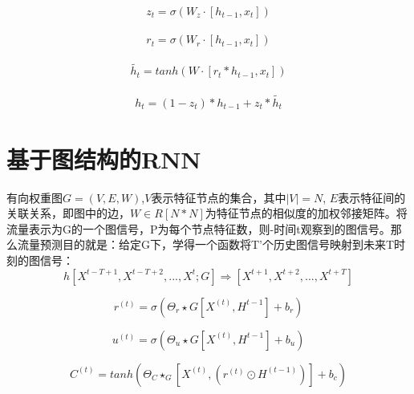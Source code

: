   \begin{equation}
    \begin{aligned}
        z_t = \sigma(W_z\cdot [h_{t-1},x_t])
    \end{aligned}
\end{equation}

\begin{equation}
    \begin{aligned}
        r_t = \sigma(W_r\cdot[h_{t-1},x_t])
    \end{aligned}
\end{equation}

\begin{equation}
    \begin{aligned}
        \widetilde {h_t} = tanh(W\cdot[r_t * h_{t-1}, x_t])
    \end{aligned}
\end{equation}

\begin{equation}
    \begin{aligned}
        h_t = (1- z_t) * h_{t-1} + z_t * \widetilde{h_t}
    \end{aligned}
\end{equation}

\section{基于图结构的RNN}
有向权重图$G=(V,E,W)$,$V$表示特征节点的集合，其中$|V|=N$, $E$表示特征间的关联关系，即图中的边，$W∈R[N*N]$为特征节点的相似度的加权邻接矩阵。将流量表示为G的一个图信号，P为每个节点特征数，则-时间t观察到的图信号。那么流量预测目的就是：给定G下，学得一个函数将T'个历史图信号映射到未来T时刻的图信号：
\begin{equation}
    h[X^{t-T+1}, X^{t-T+2},...,X^{t}; G] \Rightarrow [X^{t+1}, X^{t+2}, ..., X^{t+T}]
\end{equation}

\begin{equation}
    r^{(t)} = \sigma(\Theta_r\star G[X^{(t)},H^{t-1}] + b_r)
\end{equation}

\begin{equation}
    u^{(t)} = \sigma(\Theta_u\star G[X^{(t)},H^{t-1}] + b_u)
\end{equation}

\begin{equation}
    C^{(t)} = tanh(\Theta_C\star_G[X^{(t)},(r^{(t)}\odot H^{(t-1)})] + b_c)
\end{equation}

